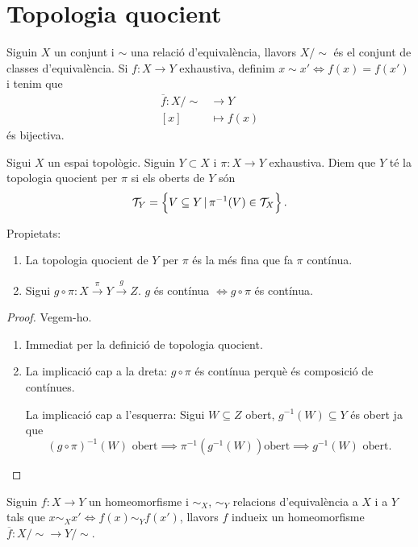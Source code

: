 \section{Topologia quocient}
\begin{obs}
	Siguin $X$ un conjunt i $\sim$ una relació d'equivalència, llavors $X/\sim$ \'es el conjunt de classes d'equivalència. Si $f\colon X\rightarrow Y$ exhaustiva, definim $x\sim x' \iff f(x) = f(x')$ i tenim que
	\begin{align*}
		\overline{f} \colon X/\sim &\rightarrow Y \\
		\left[ x \right] &\mapsto f(x)
	\end{align*}
	\'es bijectiva.
\end{obs}
\begin{defi}
	Sigui $X$ un espai topològic. Siguin $Y\subset X$ i $\pi \colon X \rightarrow Y$ exhaustiva. Diem que $Y$ t\'e la topologia quocient per $\pi$ si els oberts de $Y$ són
	\[ \mathcal{T}_Y = \left\{ V\subseteq Y\,|\,\pi^{-1}(V) \in \mathcal{T}_X \right\}. \]
\end{defi}
\begin{prop}
	Propietats:
	\begin{enumerate}
		\item La topologia quocient de $Y$ per $\pi$ \'es la m\'es fina que fa $\pi$ contínua.
		\item Sigui $g\circ\pi \colon X \stackrel{\pi}{\rightarrow} Y \stackrel{g}{\rightarrow} Z$. $g$ \'es contínua $\iff g\circ\pi$ \'es contínua.
	\end{enumerate}
\end{prop}
\begin{proof}
	Vegem-ho.
	\begin{enumerate}
		\item Immediat per la definició de topologia quocient.
		\item La implicació cap a la dreta: $g \circ \pi$ \'es contínua perquè \'es composició de contínues.

			La implicació cap a l'esquerra: Sigui $W \subseteq Z$ obert, $g^{-1}(W) \subseteq Y$ \'es obert ja que
			\[
				\left( g\circ \pi \right)^{-1}\left( W \right) \text{ obert} \implies \pi^{-1}\left( g^{-1}\left( W \right) \right) \text{obert} \implies g^{-1}\left( W \right) \text{ obert.}
			\]
	\end{enumerate}
\end{proof}
\begin{prop}
	Siguin $f\colon X\rightarrow Y$ un homeomorfisme i $\sim_X$, $\sim_Y$ relacions d'equivalència a $X$ i a $Y$ tals que $x \sim_X x' \iff f\left( x \right) \sim_Y f\left( x' \right)$, llavors $f$ indueix un homeomorfisme $\overline{f} \colon X/\sim \rightarrow Y/\sim$.
\end{prop}
